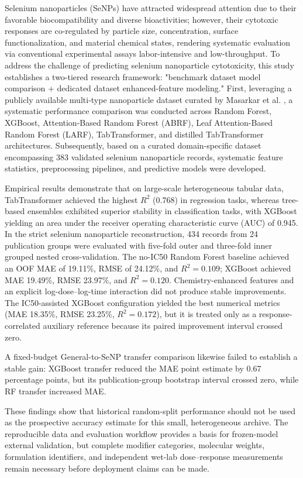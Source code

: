 Selenium nanoparticles (SeNPs) have attracted widespread attention due to their favorable biocompatibility and diverse bioactivities; however, their cytotoxic responses are co-regulated by particle size, concentration, surface functionalization, and material chemical states, rendering systematic evaluation via conventional experimental assays labor-intensive and low-throughput. To address the challenge of predicting selenium nanoparticle cytotoxicity, this study establishes a two-tiered research framework: "benchmark dataset model comparison + dedicated dataset enhanced-feature modeling." First, leveraging a publicly available multi-type nanoparticle dataset curated by Masarkar et al. \cite{masarkar2024}, a systematic performance comparison was conducted across Random Forest, XGBoost, Attention-Based Random Forest (ABRF), Leaf Attention-Based Random Forest (LARF), TabTransformer, and distilled TabTransformer architectures. Subsequently, based on a curated domain-specific dataset encompassing 383 validated selenium nanoparticle records, systematic feature statistics, preprocessing pipelines, and predictive models were developed.

Empirical results demonstrate that on large-scale heterogeneous tabular data, TabTransformer achieved the highest $R^2$ (0.768) in regression tasks, whereas tree-based ensembles exhibited superior stability in classification tasks, with XGBoost yielding an area under the receiver operating characteristic curve (AUC) of 0.945. In the strict selenium nanoparticle reconstruction, 434 records from 24 publication groups were evaluated with five-fold outer and three-fold inner grouped nested cross-validation. The no-IC50 Random Forest baseline achieved an OOF MAE of 19.11\%, RMSE of 24.12\%, and $R^2=0.109$; XGBoost achieved MAE 19.49\%, RMSE 23.97\%, and $R^2=0.120$. Chemistry-enhanced features and an explicit log-dose--log-time interaction did not produce stable improvements. The IC50-assisted XGBoost configuration yielded the best numerical metrics (MAE 18.35\%, RMSE 23.25\%, $R^2=0.172$), but it is treated only as a response-correlated auxiliary reference because its paired improvement interval crossed zero.

A fixed-budget General-to-SeNP transfer comparison likewise failed to establish a stable gain: XGBoost transfer reduced the MAE point estimate by 0.67 percentage points, but its publication-group bootstrap interval crossed zero, while RF transfer increased MAE.

These findings show that historical random-split performance should not be used as the prospective accuracy estimate for this small, heterogeneous archive. The reproducible data and evaluation workflow provides a basis for frozen-model external validation, but complete modifier categories, molecular weights, formulation identifiers, and independent wet-lab dose--response measurements remain necessary before deployment claims can be made.
